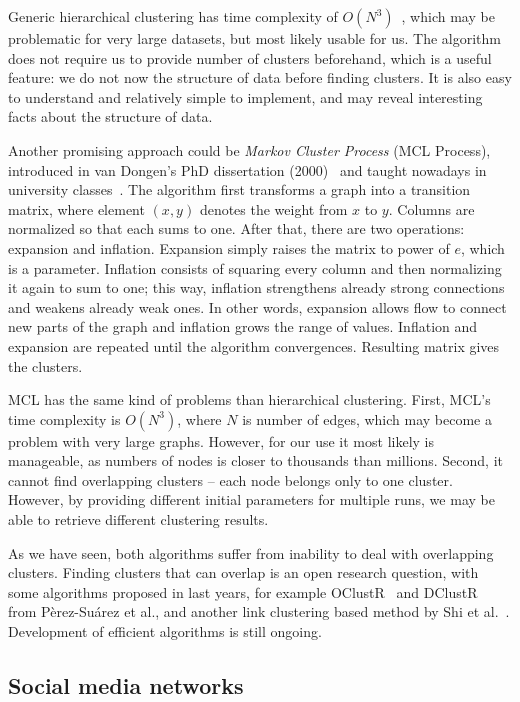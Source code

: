 \documentclass[12pt,a4paper,oneside,pdftex]{report}
\begin{document}
Generic hierarchical clustering has time complexity of $O(N^3)$~\cite{manning2008introduction}, which may be problematic for very large datasets, but most likely usable for us. The algorithm does not require us to provide number of clusters beforehand, which is a useful feature: we do not now the structure of data before finding clusters. It is also easy to understand and relatively simple to implement, and may reveal interesting facts about the structure of data.

Another promising approach could be \emph{Markov Cluster Process} (MCL Process), introduced in van Dongen's PhD dissertation (2000)~\cite{van2000graph} and taught nowadays in university classes~\cite{mlc_macropol}. The algorithm first transforms a graph into a transition matrix, where element $(x,y)$ denotes the weight from $x$ to $y$. Columns are normalized so that each sums to one. After that, there are two operations: expansion and inflation. Expansion simply raises the matrix to power of $e$, which is a parameter. Inflation consists of squaring every column and then normalizing it again to sum to one; this way, inflation strengthens already strong connections and weakens already weak ones. In other words, expansion allows flow to connect new parts of the graph and inflation grows the range of values. Inflation and expansion are repeated until the algorithm convergences. Resulting matrix gives the clusters.

MCL has the same kind of problems than hierarchical clustering. First, MCL's time complexity is $O(N^3)$, where $N$ is number of edges, which may become a problem with very large graphs. However, for our use it most likely is manageable, as numbers of nodes is closer to thousands than millions. Second, it cannot find overlapping clusters -- each node belongs only to one cluster. However, by providing different initial parameters for multiple runs, we may be able to retrieve different clustering results.

As we have seen, both algorithms suffer from inability to deal with overlapping clusters. Finding clusters that can overlap is an open research question, with some algorithms proposed in last years, for example OClustR~\cite{PerezSuarez2013234} and DClustR~\cite{PerezSuarez20133040} from P\`{e}rez-Su\'{a}rez et al., and another link clustering based method by Shi et al.~\cite{Shi2013394}. Development of efficient algorithms is still ongoing.


\subsection{Social media networks}
\label{subsec:social_media}
\end{document}
